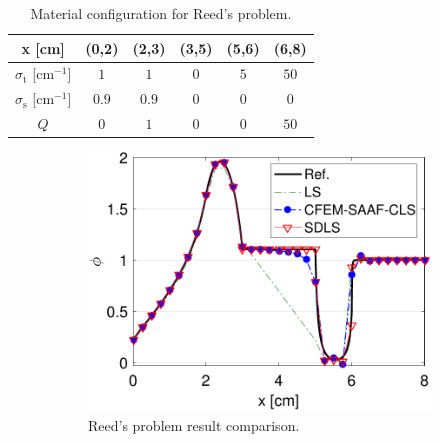\documentclass[review]{elsarticle}
\newcommand{\st}{\sigma_\mathrm{t}}
\newcommand{\sigs}{\sigma_\mathrm{s}}
\begin{document}
\begin{table}[ht!]
	\centering
	\caption{Material configuration for Reed's problem.}
	\label{tb:reed}
	\hspace*{0cm}\begin{tabular}{|c|c|c|c|c|c|}
		\hline
		x [cm] & (0,2) & (2,3) & (3,5) & (5,6)& (6,8)\\
		\hline
		$\st$ [cm$^{-1}$]& $1$ & $1$ & $0$ & $5$&$50$\\
		\hline
		$\sigs$ [cm$^{-1}$]& $0.9$ & $0.9$ & $0$ & $0$&$0$\\
		\hline
		$Q$& $0$ & $1$ & $0$ & $0$&$50$\\
		\hline
	\end{tabular}
\end{table}

\begin{figure}[ht!]
	\begin{subfigure}{.5\textwidth}
		\begin{center}
			\hspace*{-2.5cm}\includegraphics[width=1.3\textwidth]{cdls-reed}
			\caption[]{Reed's problem result comparison.}%
			\label{f:reed-real}
		\end{center}
	\end{subfigure}
	~
	\begin{subfigure}{.5\textwidth}
		\begin{center}

\end{center}
\end{subfigure}
\end{figure}
\end{document}
